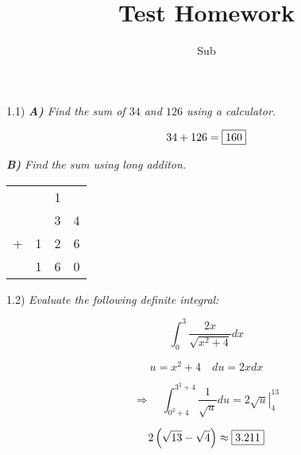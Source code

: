 \documentclass[12.0pt, letterpaper]{article}
\author{Sub}
\title{Test Homework}
\begin{document}
    \begin{paragraph}{1.1)}
        \textit{
            \textbf{A)} Find the sum of $34$ and $126$ using a calculator.
        }

        \begin{equation*}
            34 + 126 = \framebox{160}
        \end{equation*}

        \textit{
            \textbf{B)} Find the sum using long additon.
        }
        
        \begin{center}
            \begin{tabular}{cccc}
                &  & 1 &   \\
                &  & 3 & 4 \\
            +  & 1 & 2 & 6 \\
                \hline
               & 1 & 6 & 0 \\
                
            \end{tabular}
        \end{center}
    \end{paragraph}
    
    \begin{paragraph}{1.2)}
        \textit{
            Evaluate the following definite integral:
        }

        \begin{equation*}
            \int_{0}^{3} \frac{2x}{\sqrt{x^2+4}} dx 
        \end{equation*}
        
        $$
            u = x^2 + 4 
            \quad
            du = 2xdx
        $$
        
        \begin{equation*}
            \Rightarrow\quad
            \int_{0^2+4}^{3^2+4} \frac{1}{\sqrt{u}} du = 
            \left. 2\sqrt{u} \right |_{4}^{13}
        \end{equation*}
        
        \begin{equation*}
            2\left(\sqrt{13} - \sqrt{4}\right) \approx \framebox{3.211}
        \end{equation*}
    \end{paragraph}
\end{document}
